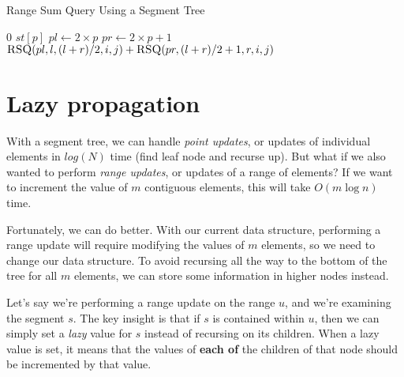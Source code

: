 \documentclass[11pt]{article}
\begin{document}
\begin{algorithm}[H]
\caption{Range Sum Query Using a Segment Tree}
\begin{algorithmic}
            \State \Return $0$
        \EndIf
            \State \Return $st[p]$
        \EndIf
        \State $pl \gets 2 \times p$
        \State $pr \gets 2 \times p + 1$
        \State \Return $\Call{RSQ}{pl, l, (l + r) / 2, i, j} + \Call{RSQ}{pr, (l + r) / 2 + 1, r, i, j}$
    \EndFunction
\end{algorithmic}
\end{algorithm}

\section{Lazy propagation}
With a segment tree, we can handle \textit{point updates}, or updates of individual elements in $log(N)$ time (find leaf node and recurse up). But what if we also wanted to perform \textit{range updates}, or updates of a range of elements? If we want to increment the value of $m$ contiguous elements, this will take $O(m \log n)$ time.

Fortunately, we can do better. With our current data structure, performing a range update will require modifying the values of $m$ elements, so we need to change our data structure. To avoid recursing all the way to the bottom of the tree for all $m$ elements, we can store some information in higher nodes instead.

Let's say we're performing a range update on the range $u$, and we're examining the segment $s$. The key insight is that if $s$ is contained within $u$, then we can simply set a \textit{lazy} value for $s$ instead of recursing on its children. When a lazy value is set, it means that the values of \textbf{each of} the children of that node should be incremented by that value.
\end{document}
